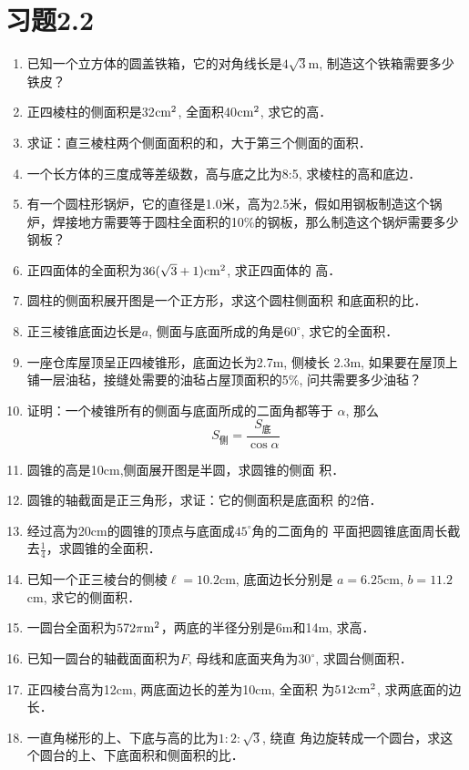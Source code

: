 \section*{习题2.2}

\begin{enumerate}
\item 已知一个立方体的圆盖铁箱，它的对角线长是$4\sqrt{3}$m, 制造这个铁箱需要多少铁皮？
\item 正四棱柱的侧面积是32${\rm cm^2}$, 全面积40${\rm cm^2}$, 求它的高．    
\item 求证：直三棱柱两个侧面面积的和，大于第三个侧面的面积．
\item 一个长方体的三度成等差级数，高与底之比为8:5, 
求棱柱的高和底边．
\item 有一个圆柱形锅炉，它的直径是1.0米，高为2.5米，假如用钢板制造这个锅炉，焊接地方需要等于圆柱全面积的10\%的钢板，那么制造这个锅炉需要多少钢板？
\item 正四面体的全面积为$36(\sqrt{3}+1){\rm cm^2}$, 求正四面体的
高．
\item 圆柱的侧面积展开图是一个正方形，求这个圆柱侧面积
和底面积的比．
\item 正三棱锥底面边长是$a$, 侧面与底面所成的角是$60^{\circ}$, 
求它的全面积．
\item 一座仓库屋顶呈正四棱锥形，底面边长为2.7m, 侧棱长
2.3m, 如果要在屋顶上铺一层油毡，接缝处需要的油毡占屋顶面积的5\%, 问共需要多少油毡？
\item 证明：一个棱锥所有的侧面与底面所成的二面角都等于
$\alpha$, 那么
\[S_{\text{侧}}=\frac{S_{\text{底}}}{\cos\alpha}\]
\item 圆锥的高是10cm,侧面展开图是半圆，求圆锥的侧面
积．
\item 圆锥的轴截面是正三角形，求证：它的侧面积是底面积
的2倍．
\item 经过高为20cm的圆锥的顶点与底面成$45^{\circ}$角的二面角的
平面把圆锥底面周长截去$\frac{1}{4}$，求圆锥的全面积．
\item 已知一个正三棱台的侧棱$\ell=10.2$cm, 底面边长分别是
$a=6.25$cm, $b=11.2$cm, 求它的侧面积．
\item 一圆台全面积为$572\pi {\rm m^2}$，两底的半径分别是6m和14m, 
求高．
\item 已知一圆台的轴截面面积为$F$, 母线和底面夹角为$30^{\circ}$, 
求圆台侧面积．
\item 正四棱台高为12cm, 两底面边长的差为10cm, 全面积
为$512{\rm cm^2}$, 求两底面的边长．
\item 一直角梯形的上、下底与高的比为$1:2:\sqrt{3}$, 绕直
角边旋转成一个圆台，求这个圆台的上、下底面积和侧面积的比．

\end{enumerate}
